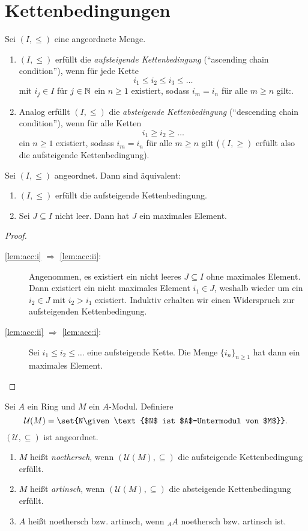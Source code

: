 \documentclass[12pt,a4paper]{scrartcl}
\theoremstyle{cplain}
\theoremstyle{cdef}
\begin{document}
\section{Kettenbedingungen}
\begin{defi}
	Sei $(I, \le)$ eine angeordnete Menge.
	\begin{enumerate}
		\item $(I,\le)$ erfüllt die \emph{aufsteigende Kettenbedingung} (\enquote{ascending chain condition}), wenn für jede Kette
		\[i_1\le i_2\le i_3\le \dots\]
		mit $i_j\in I$ für $j\in \mathbb N$ ein $n\ge 1$ existiert, sodass $i_m = i_n$ für alle $m\ge n$ gilt:.
		\item Analog erfüllt $(I,\le)$ die \emph{absteigende Kettenbedingung} (\enquote{descending chain condition}), wenn für alle Ketten
		\[i_1\ge i_2\ge \dots \]
		ein $n\ge 1$ existiert, sodass $i_m = i_n$ für alle $m\ge n$ gilt ($(I,\ge)$ erfüllt also die aufsteigende Kettenbedingung).
	\end{enumerate}
\end{defi}
\begin{lem} \label{lem:acc}
	Sei $(I,\le)$ angeordnet. Dann sind äquivalent:
	\begin{enumerate}
		\item $(I,\le)$ erfüllt die aufsteigende Kettenbedingung. \label{lem:acc:i}
		\item Sei $J\subseteq I$ nicht leer. Dann hat $J$ ein maximales Element. \label{lem:acc:ii}
	\end{enumerate}
\end{lem}
\begin{proof}
	\leavevmode
	\begin{description}
		\item[\ref{lem:acc:i} $\Rightarrow$ \ref{lem:acc:ii}:] Angenommen, es existiert ein nicht leeres $J\subseteq I$ ohne maximales Element. Dann existiert ein nicht maximales Element $i_1\in J$, weshalb wieder um ein $i_2\in J$ mit $i_2>i_1$ existiert. Induktiv erhalten wir einen Widerspruch zur aufsteigenden Kettenbedingung.
		\item[\ref{lem:acc:ii} $\Rightarrow$ \ref{lem:acc:i}:] Sei $i_1\le i_2\le\dots$ eine aufsteigende Kette. Die Menge $\{i_n\}_{n\ge 1}$ hat dann ein maximales Element.
		\qedhere
	\end{description}
\end{proof}
\begin{defi}
	Sei $A$ ein Ring und $M$ ein $A$-Modul. Definiere
	\[\mathcal{U}(M) = \set{N\given \text{$N$ ist $A$-Untermodul von $M$}}.\]
	$(\mathcal{U}, \subseteq)$ ist angeordnet.
	\begin{enumerate}
		\item $M$ heißt \emph{noethersch}, wenn $(\mathcal{U}(M),\subseteq)$ die aufsteigende Kettenbedingung erfüllt.
		\item $M$ heißt \emph{artinsch}, wenn $(\mathcal{U}(M), \subseteq)$ die absteigende Kettenbedingung erfüllt.
		\item $A$ heißt noethersch bzw. artinsch, wenn ${}_AA$ noethersch bzw. artinsch ist.
	\end{enumerate}
\end{defi}
\end{document}

